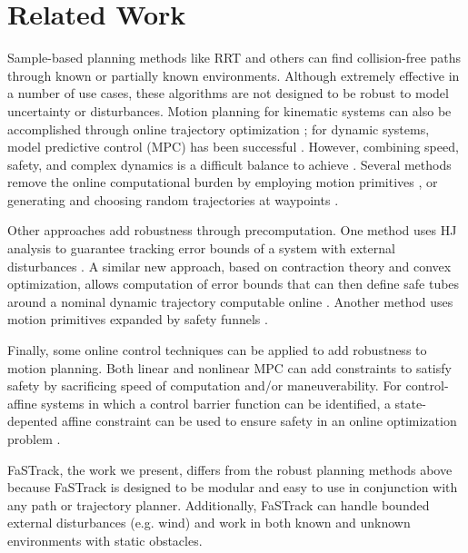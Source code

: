 \section{Related Work \label{sec:relatedwork}}
Sample-based planning methods like RRT \cite{Kuffner2000} and others \cite{Kavraki1996,Janson2015,Richter2016, Karaman2011, Kobilarov2012} can find collision-free paths through known or partially known environments. Although extremely effective in a number of use cases, these algorithms are not designed to be robust to model uncertainty or disturbances. Motion planning for kinematic systems can also be accomplished through online trajectory optimization \cite{Schulman2013,Ratliff2009}; for dynamic systems, model predictive control (MPC) has been successful \cite{Qin2003}. However, combining speed, safety, and complex dynamics is a difficult balance to achieve \cite{Vitus2008, Zeilinger2011, Richter2012}. Several methods remove the online computational burden by employing motion primitives \cite{Gillula2010, Dey2016}, or generating and choosing random trajectories at waypoints \cite{Kalakrishnan2011, Schwesinger2013}. 


Other approaches add robustness through precomputation. One method uses HJ analysis to guarantee tracking error bounds of a system with external disturbances \cite{Bansal2017}. A similar new approach, based on contraction theory and convex optimization, allows computation of error bounds that can then define safe tubes around a nominal dynamic trajectory computable online \cite{Singh2017}.  Another method uses motion primitives expanded by safety funnels \cite{Majumdar2017}.

Finally, some online control techniques can be applied to add robustness to motion planning. Both linear and nonlinear MPC can add constraints to satisfy safety \cite{Richards2006, DiCairano2016,Hoy2015} by sacrificing speed of computation and/or maneuverability. For control-affine systems in which a control barrier function can be identified, a state-depented affine constraint can be used to ensure safety in an online optimization problem \cite{Ames2014}.

FaSTrack, the work we present, differs from the robust planning methods above because FaSTrack is designed to be modular and easy to use in conjunction with any path or trajectory planner. Additionally, FaSTrack can handle bounded external disturbances (e.g. wind) and work in both known and unknown environments with static obstacles.